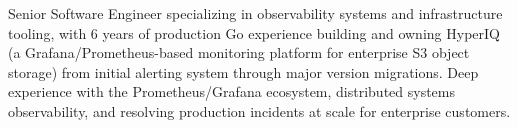 
\begin{cvparagraph}
Senior Software Engineer specializing in observability systems and infrastructure tooling, with 6 years of production Go experience building and owning HyperIQ (a Grafana/Prometheus-based monitoring platform for enterprise S3 object storage) from initial alerting system through major version migrations. Deep experience with the Prometheus/Grafana ecosystem, distributed systems observability, and resolving production incidents at scale for enterprise customers.
\end{cvparagraph}
